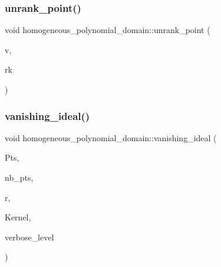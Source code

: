 \mbox{\label{classhomogeneous__polynomial__domain_a913856cb9020e671f7792f186b94af68}} 
\subsubsection{\texorpdfstring{unrank\+\_\+point()}{unrank\_point()}}
{\footnotesize\ttfamily void homogeneous\+\_\+polynomial\+\_\+domain\+::unrank\+\_\+point (\begin{DoxyParamCaption}\item[{\mbox{\hyperlink{galois_8h_a09fddde158a3a20bd2dcadb609de11dc}{I\+NT}} $\ast$}]{v,  }\item[{\mbox{\hyperlink{galois_8h_a09fddde158a3a20bd2dcadb609de11dc}{I\+NT}}}]{rk }\end{DoxyParamCaption})}

\mbox{\label{classhomogeneous__polynomial__domain_a7037f7f1cd49d297eb3063b6b04699e2}} 
\subsubsection{\texorpdfstring{vanishing\+\_\+ideal()}{vanishing\_ideal()}}
{\footnotesize\ttfamily void homogeneous\+\_\+polynomial\+\_\+domain\+::vanishing\+\_\+ideal (\begin{DoxyParamCaption}\item[{\mbox{\hyperlink{galois_8h_a09fddde158a3a20bd2dcadb609de11dc}{I\+NT}} $\ast$}]{Pts,  }\item[{\mbox{\hyperlink{galois_8h_a09fddde158a3a20bd2dcadb609de11dc}{I\+NT}}}]{nb\+\_\+pts,  }\item[{\mbox{\hyperlink{galois_8h_a09fddde158a3a20bd2dcadb609de11dc}{I\+NT}} \&}]{r,  }\item[{\mbox{\hyperlink{galois_8h_a09fddde158a3a20bd2dcadb609de11dc}{I\+NT}} $\ast$}]{Kernel,  }\item[{\mbox{\hyperlink{galois_8h_a09fddde158a3a20bd2dcadb609de11dc}{I\+NT}}}]{verbose\+\_\+level }\end{DoxyParamCaption})}



